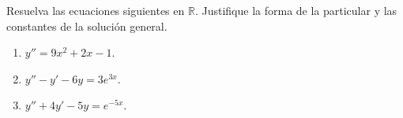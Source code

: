 Resuelva las ecuaciones siguientes en $\mathbb R$. Justifique la forma de la particular y las constantes de la solución general.

\begin{enumerate}[label=(\alph*),ref=\alph*,leftmargin=*]
\item $y''=9x^2+2x-1$.
\item $y''-y'-6y=3e^{3x}$.
\item $y''+4y'-5y=e^{-5x}$.
\end{enumerate}
